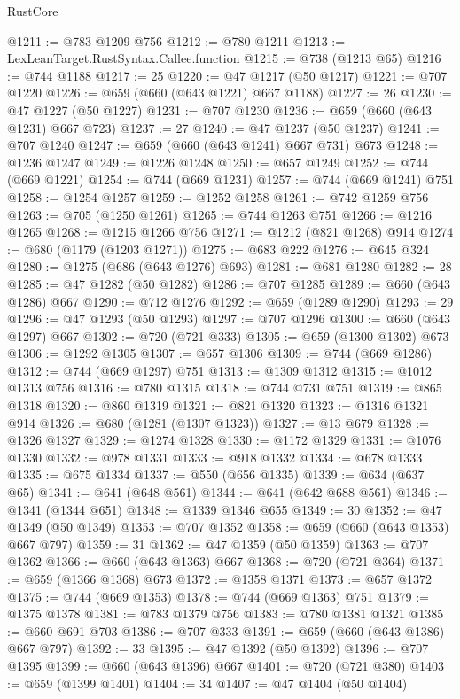 \begin{lexlean}{RustCore}
\begin{coremodule}
@1211 := @783 @1209 @756
@1212 := @780 @1211
@1213 := LexLeanTarget.RustSyntax.Callee.function
@1215 := @738 (@1213 @65)
@1216 := @744 @1188
@1217 := 25
@1220 := @47 @1217 (@50 @1217)
@1221 := @707 @1220
@1226 := @659 (@660 (@643 @1221) @667 @1188)
@1227 := 26
@1230 := @47 @1227 (@50 @1227)
@1231 := @707 @1230
@1236 := @659 (@660 (@643 @1231) @667 @723)
@1237 := 27
@1240 := @47 @1237 (@50 @1237)
@1241 := @707 @1240
@1247 := @659 (@660 (@643 @1241) @667 @731) @673
@1248 := @1236 @1247
@1249 := @1226 @1248
@1250 := @657 @1249
@1252 := @744 (@669 @1221)
@1254 := @744 (@669 @1231)
@1257 := @744 (@669 @1241) @751
@1258 := @1254 @1257
@1259 := @1252 @1258
@1261 := @742 @1259 @756
@1263 := @705 (@1250 @1261)
@1265 := @744 @1263 @751
@1266 := @1216 @1265
@1268 := @1215 @1266 @756
@1271 := @1212 (@821 @1268) @914
@1274 := @680 (@1179 (@1203 @1271))
@1275 := @683 @222
@1276 := @645 @324
@1280 := @1275 (@686 (@643 @1276) @693)
@1281 := @681 @1280
@1282 := 28
@1285 := @47 @1282 (@50 @1282)
@1286 := @707 @1285
@1289 := @660 (@643 @1286) @667
@1290 := @712 @1276
@1292 := @659 (@1289 @1290)
@1293 := 29
@1296 := @47 @1293 (@50 @1293)
@1297 := @707 @1296
@1300 := @660 (@643 @1297) @667
@1302 := @720 (@721 @333)
@1305 := @659 (@1300 @1302) @673
@1306 := @1292 @1305
@1307 := @657 @1306
@1309 := @744 (@669 @1286)
@1312 := @744 (@669 @1297) @751
@1313 := @1309 @1312
@1315 := @1012 @1313 @756
@1316 := @780 @1315
@1318 := @744 @731 @751
@1319 := @865 @1318
@1320 := @860 @1319
@1321 := @821 @1320
@1323 := @1316 @1321 @914
@1326 := @680 (@1281 (@1307 @1323))
@1327 := @13 @679
@1328 := @1326 @1327
@1329 := @1274 @1328
@1330 := @1172 @1329
@1331 := @1076 @1330
@1332 := @978 @1331
@1333 := @918 @1332
@1334 := @678 @1333
@1335 := @675 @1334
@1337 := @550 (@656 @1335)
@1339 := @634 (@637 @65)
@1341 := @641 (@648 @561)
@1344 := @641 (@642 @688 @561)
@1346 := @1341 (@1344 @651)
@1348 := @1339 @1346 @655
@1349 := 30
@1352 := @47 @1349 (@50 @1349)
@1353 := @707 @1352
@1358 := @659 (@660 (@643 @1353) @667 @797)
@1359 := 31
@1362 := @47 @1359 (@50 @1359)
@1363 := @707 @1362
@1366 := @660 (@643 @1363) @667
@1368 := @720 (@721 @364)
@1371 := @659 (@1366 @1368) @673
@1372 := @1358 @1371
@1373 := @657 @1372
@1375 := @744 (@669 @1353)
@1378 := @744 (@669 @1363) @751
@1379 := @1375 @1378
@1381 := @783 @1379 @756
@1383 := @780 @1381 @1321
@1385 := @660 @691 @703
@1386 := @707 @333
@1391 := @659 (@660 (@643 @1386) @667 @797)
@1392 := 33
@1395 := @47 @1392 (@50 @1392)
@1396 := @707 @1395
@1399 := @660 (@643 @1396) @667
@1401 := @720 (@721 @380)
@1403 := @659 (@1399 @1401)
@1404 := 34
@1407 := @47 @1404 (@50 @1404)

\end{coremodule}
\end{lexlean}
